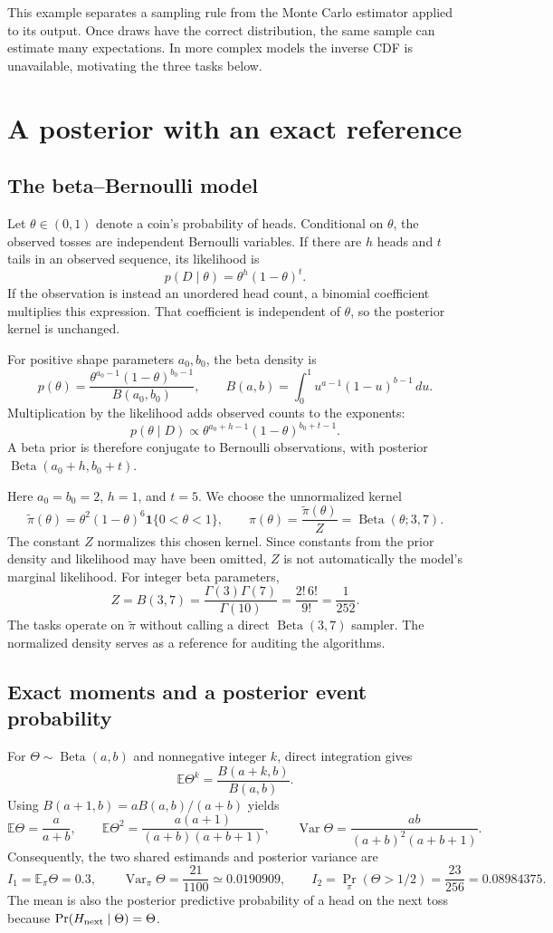 \documentclass[11pt,a4paper]{article}
\newcommand{\E}{\mathbb E}
\newcommand{\Var}{\operatorname{Var}}
\newcommand{\ind}{\mathbf 1}
\begin{document}
This example separates a sampling rule from the Monte Carlo estimator applied
to its output. Once draws have the correct distribution, the same sample can
estimate many expectations. In more complex models the inverse CDF is
unavailable, motivating the three tasks below.

\FloatBarrier
\section{A posterior with an exact reference}
\subsection{The beta--Bernoulli model}
Let $\theta\in(0,1)$ denote a coin's probability of heads. Conditional on
$\theta$, the observed tosses are independent Bernoulli variables. If there are
$h$ heads and $t$ tails in an observed sequence, its likelihood is
\[
 p(D\mid\theta)=\theta^h(1-\theta)^t.
\]
If the observation is instead an unordered head count, a binomial coefficient
multiplies this expression. That coefficient is independent of $\theta$, so
the posterior kernel is unchanged.

For positive shape parameters $a_0,b_0$, the beta density is
\[
 p(\theta)=\frac{\theta^{a_0-1}(1-\theta)^{b_0-1}}{B(a_0,b_0)},\qquad
 B(a,b)=\int_0^1u^{a-1}(1-u)^{b-1}\,du.
\]
Multiplication by the likelihood adds observed counts to the exponents:
\[
 p(\theta\mid D)\propto
 \theta^{a_0+h-1}(1-\theta)^{b_0+t-1}.
\]
A beta prior is therefore conjugate to Bernoulli observations, with posterior
$\operatorname{Beta}(a_0+h,b_0+t)$.

Here $a_0=b_0=2$, $h=1$, and $t=5$. We choose the unnormalized kernel
\[
 \widetilde\pi(\theta)=\theta^2(1-\theta)^6\ind\{0<\theta<1\},\qquad
 \pi(\theta)=\frac{\widetilde\pi(\theta)}Z
 =\operatorname{Beta}(\theta;3,7).
\]
The constant $Z$ normalizes this chosen kernel. Since constants from the prior
density and likelihood may have been omitted, $Z$ is not automatically the
model's marginal likelihood. For integer beta parameters,
\[
 Z=B(3,7)=\frac{\Gamma(3)\Gamma(7)}{\Gamma(10)}
 =\frac{2!\,6!}{9!}=\frac1{252}.
\]
The tasks operate on $\widetilde\pi$ without calling a direct
$\operatorname{Beta}(3,7)$ sampler. The normalized density serves as a reference
for auditing the algorithms.

\subsection{Exact moments and a posterior event probability}
For $\Theta\sim\operatorname{Beta}(a,b)$ and nonnegative integer $k$, direct integration gives
\[
 \E\Theta^k=\frac{B(a+k,b)}{B(a,b)}.
\]
Using $B(a+1,b)=aB(a,b)/(a+b)$ yields
\[
 \E\Theta=\frac a{a+b},\qquad
 \E\Theta^2=\frac{a(a+1)}{(a+b)(a+b+1)},\qquad
 \Var\Theta=\frac{ab}{(a+b)^2(a+b+1)}.
\]
Consequently, the two shared estimands and posterior variance are
\[
 I_1=\E_\pi\Theta=0.3,\qquad
 \Var_\pi\Theta=\frac{21}{1100}\simeq0.0190909,\qquad
 I_2=\Pr_\pi(\Theta>1/2)=\frac{23}{256}=0.08984375.
\]
The mean is also the posterior predictive probability of a head on the next
toss because $\Pr(H_{\rm next}\mid\Theta)=\Theta$.
\end{document}
